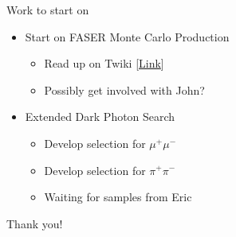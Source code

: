 \begin{frame}{Work to start on}
    \begin{itemize}
        \item Start on FASER Monte Carlo Production 
        \begin{itemize}
            \item Read up on Twiki [\href{https://twiki.cern.ch/twiki/bin/view/FASER/MonteCarloProduction}{Link}]
            \item Possibly get involved with John?
        \end{itemize}
        \item Extended Dark Photon Search
        \begin{itemize}
            \item Develop selection for $\mu^+ \mu^-$
            \item Develop selection for $\pi^+ \pi^-$
            \item Waiting for samples from Eric
        \end{itemize}
    \end{itemize}
\end{frame}

\begin{frame}
    \centering
    \Large Thank you!
\end{frame}